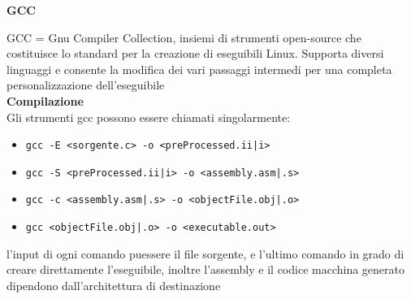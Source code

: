 \begin{flushleft}
  \textbf{GCC} \par 
  GCC = Gnu Compiler Collection, insiemi di strumenti open-source che costituisce 
  lo standard per la creazione di eseguibili Linux. Supporta diversi linguaggi e consente
  la modifica dei vari passaggi intermedi per una completa personalizzazione dell'eseguibile\\
  \textbf{Compilazione} \\
  Gli strumenti gcc possono essere chiamati singolarmente:
  \begin{itemize}
    \item \texttt{gcc -E <sorgente.c> -o <preProcessed.ii|i>}
    \item \texttt{gcc -S <preProcessed.ii|i> -o <assembly.asm|.s>}
    \item \texttt{gcc -c <assembly.asm|.s> -o <objectFile.obj|.o>}
    \item \texttt{gcc <objectFile.obj|.o> -o <executable.out>}
  \end{itemize}
  l'input di ogni comando pu\aco essere il file sorgente, e l'ultimo comando \ace in grado di creare
  direttamente l'eseguibile, inoltre l'assembly e il codice macchina generato dipendono 
  dall'architettura di destinazione
\end{flushleft}
